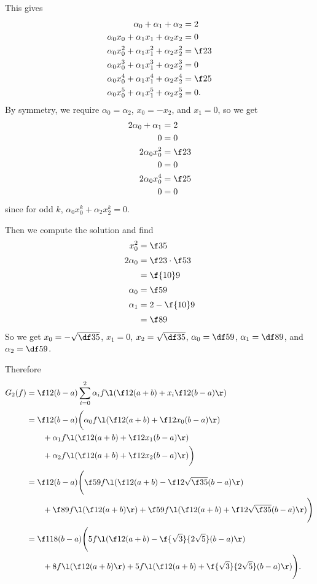 \documentclass[a4paper]{article}
\begin{document}
This gives
\begin{align*}
\alpha_0 + \alpha_1 + \alpha_2 &= 2 \\
\alpha_0 x_0 + \alpha_1 x_1 + \alpha_2 x_2 &= 0 \\
\alpha_0 x_0^2 + \alpha_1 x_1^2 + \alpha_2 x_2^2 &= \f23 \\
\alpha_0 x_0^3 + \alpha_1 x_1^3 + \alpha_2 x_2^3 &= 0 \\
\alpha_0 x_0^4 + \alpha_1 x_1^4 + \alpha_2 x_2^4 &= \f25 \\
\alpha_0 x_0^5 + \alpha_1 x_1^5 + \alpha_2 x_2^5 &= 0.
\end{align*}
By symmetry, we require $\alpha_0 = \alpha_2$, $x_0 = -x_2$, and $x_1 = 0$, so we get
\begin{align*}
2 \alpha_0 + \alpha_1 &= 2 \\
0 &= 0 \\
2 \alpha_0 x_0^2 &= \f23 \\
0 &= 0 \\
2 \alpha_0 x_0^4 &= \f25 \\
0 &= 0
\end{align*}
since for odd $k$, $\alpha_0 x_0^k + \alpha_2 x_2^k = 0$.

Then we compute the solution and find
\begin{align*}
x_0^2 &= \f35 \\[0.5ex]
2 \alpha_0 &= \f23 \cdot \f53 \\[0.5ex]
&= \f{10}9 \\[0.5ex]
\alpha_0 &= \f59 \\[0.5ex]
\alpha_1 &= 2 - \f{10}9 \\[0.5ex]
&= \f89
\end{align*}
So we get $x_0 = -\sqrt{\df35}$, $x_1 = 0$, $x_2 = \sqrt{\df35}$, $\alpha_0 = \df59$, $\alpha_1 = \df89$, and $\alpha_2 = \df59$.

Therefore
\begin{align*}
G_2(f) &= \f12 (b - a) \sum_{i=0}^2 \alpha_i f\l( \f12 (a + b) + x_i \f12 (b - a) \r) \\[0.5ex]
&= \f12 (b - a) \bigg(
    \alpha_0 f\l( \f12 (a + b) + \f12 x_0 (b - a) \r) \\
    &\qquad + \alpha_1 f\l( \f12 (a + b) + \f12 x_1 (b - a) \r) \\
    &\qquad + \alpha_2 f\l( \f12 (a + b) + \f12 x_2 (b - a) \r)
\bigg) \\[0.5ex]
&= \f12 (b - a) \Bigg(
    \f59 f\l( \f12 (a + b) - \f12 \sqrt{\f35} (b - a) \r) \\
    &\qquad + \f89 f\l( \f12 (a + b) \r)
    + \f59 f\l( \f12 (a + b) + \f12 \sqrt{\f35} (b - a) \r)
\Bigg) \\[0.5ex]
&= \f1{18} (b - a) \Bigg(
    5 f\l( \f12 (a + b) - \f{\sqrt 3}{2 \sqrt 5} (b - a) \r) \\
    &\qquad + 8 f\l( \f12 (a + b) \r)
    + 5 f\l( \f12 (a + b) + \f{\sqrt 3}{2 \sqrt 5} (b - a) \r)
\Bigg).
\end{align*}
\end{document}
